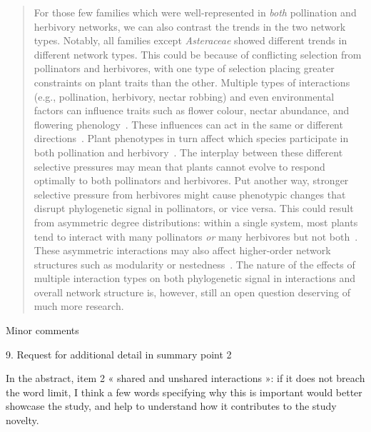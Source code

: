 \documentclass[12pt]{letter}
\newenvironment{refquote}{\bigskip \begin{it}}{\end{it}\smallskip}
\begin{document}
		\begin{quotation}

			For those few families which were well-represented in \emph{both} pollination
			and herbivory networks, we can also contrast the 
			trends in the two network types. Notably, all families except \emph{Asteraceae} 
			showed different trends in different network types. 
			This could be because of conflicting selection from pollinators and herbivores,
			with one type of selection placing greater constraints on plant traits than the other.
			Multiple types of interactions (e.g., pollination, herbivory, nectar robbing) 
			and even environmental factors can influence traits such as 
			flower colour, nectar abundance, and flowering phenology~\citep{Strauss2006}. 
			These influences can act in the same or different directions~\citep{Strauss2006}.
			Plant phenotypes in turn affect which species participate in both pollination and herbivory~\citep{Strauss1997,Strauss2002,Adler2004,Adler2006,Theis2006}.
			The interplay between these different selective pressures may mean that plants
			cannot evolve to respond optimally to both pollinators and herbivores. Put another
			way, stronger selective pressure from herbivores might cause phenotypic changes
			that disrupt phylogenetic signal in pollinators, or vice versa. This could result from
			asymmetric degree distributions: within a single system, most plants tend to interact
			with many pollinators \emph{or} many herbivores but not both~\citep{Melian2009,Pocock2012,Astegiano2017}.
			These asymmetric interactions may also affect higher-order network structures such as
			modularity or nestedness~\citep{Astegiano2017}. The nature of the effects of multiple interaction types on both phylogenetic signal in interactions and overall network structure is, however, still an open question deserving of much more research.

		\end{quotation}


	Minor comments


	9. Request for additional detail in summary point 2

		\begin{refquote}
			In the abstract, item 2 « shared and unshared interactions »: if it does not breach the word limit, I think a few words specifying why this is important would better showcase the study, and help to understand how it contributes to the study novelty.
		\end{refquote}
\end{document}
